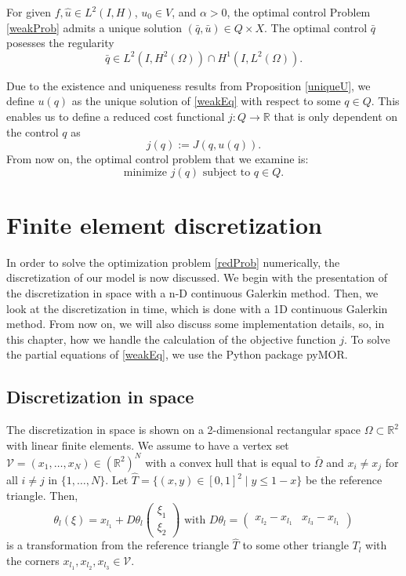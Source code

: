 \begin{prop}
For given $f,\hat{u}\in L^2(I,H)$, $u_0\in V$, and $\alpha>0$, the optimal control Problem \eqref{weakProb} admits a unique solution $(\bar{q},\bar{u})\in Q\times X$. The optimal control $\bar{q}$ posesses the regularity
\begin{displaymath}
\bar{q}\in L^2(I,H^2(\Omega))\cap H^1(I,L^2(\Omega)).
\end{displaymath}
\end{prop}

Due to the existence and uniqueness results from Proposition \ref{uniqueU}, we define $u(q)$ as the unique solution of \eqref{weakEq} with respect to some $q\in Q$. This enables us to define a reduced cost functional $j:Q\to \mathbb{R}$ that is only dependent on the control $q$ as
\begin{displaymath}
j(q):=J(q,u(q)).
\end{displaymath}
From now on, the optimal control problem that we examine is:
\begin{equation}
\label{redProb}
\text{minimize }j(q)\text{ subject to }q\in Q.
\end{equation}

\section{Finite element discretization}
In order to solve the optimization problem \eqref{redProb} numerically, the discretization of our model is now discussed. We begin with the presentation of the discretization in space with a n-D continuous Galerkin method. Then, we look at the discretization in time, which is done with a 1D continuous Galerkin method. From now on, we will also discuss some implementation details, so, in this chapter, how we handle the calculation of the objective function $j$. To solve the partial equations of \eqref{weakEq}, we use the Python package pyMOR.

\subsection{Discretization in space}
The discretization in space is shown on a 2-dimensional rectangular space $\Omega\subset\mathbb{R}^2$ with linear finite elements. We assume to have a vertex set $\mathcal{V}=(x_1,\dotsc,x_N)\in(\mathbb{R}^2)^N$ with a convex hull that is equal  to $\bar{\Omega}$ and $x_i\neq x_j$ for all $i\neq j$ in $\{1,\dotsc,N\}$. Let $\hat{T}=\{(x,y)\in[0,1]^2\mid y \leq 1-x\}$ be the reference triangle. Then,
\begin{displaymath}
\theta_l(\xi)=x_{l_1} + D\theta_l \begin{pmatrix} \xi_1 \\ \xi_2 \end{pmatrix} \text{ with } D\theta_l = \begin{pmatrix} x_{l_2}-x_{l_1} & x_{l_3}-x_{l_1} \end{pmatrix}
\end{displaymath}
is a transformation from the reference triangle $\hat{T}$ to some other triangle $T_l$ with the corners $x_{l_1}, x_{l_2}, x_{l_3}\in\mathcal{V}$.

